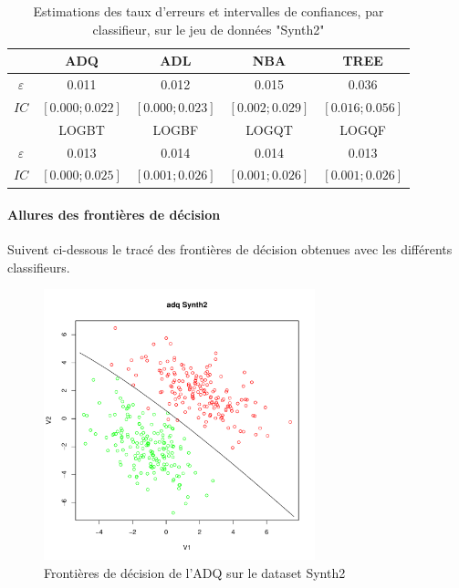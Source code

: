 \documentclass{report}
\begin{document}
\begin{table}[h!]
    \centering
    \caption{Estimations des taux d'erreurs et intervalles de confiances, par classifieur, sur le jeu de données "Synth2"}
    \label{tab:table1}
    \def\arraystretch{1.5}
    \begin{tabular}{c||c|c|c|c}
        \hline
        & ADQ & ADL & NBA & TREE\\
        \hline
        $\varepsilon$ & 0.011 & 0.012 & 0.015
        & 0.036\\
        \hline
        $IC$ & $[0.000 ; 0.022]$ & $[0.000 ; 0.023]$ & $[0.002 ; 0.029]$
        & $[0.016 ; 0.056]$\\
        \hline
        \hline
        & LOGBT & LOGBF & LOGQT & LOGQF\\
        \hline
        $\varepsilon$ & 0.013 & 0.014 & 0.014 & 0.013\\
        \hline
        $IC$ & $[0.000 ; 0.025]$ & $[0.001 ; 0.026]$ & $[0.001 ; 0.026]$ & $[0.001 ; 0.026]$\\
        \hline
        \hline
    \end{tabular}
\end{table}

\paragraph{Allures des frontières de décision}
Suivent ci-dessous le tracé des frontières de décision obtenues avec les différents classifieurs.

\begin{figure}[ht!]
\begin{center}
    \includegraphics[width=0.7\textwidth]{results/adq/adq-Synth2.pdf}
    \caption{Frontières de décision de l'ADQ sur le dataset Synth2}
\end{center}
\end{figure}
\end{document}
